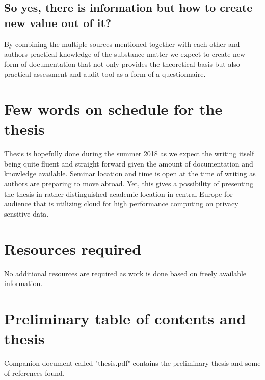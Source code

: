 \documentclass{article}
\begin{document}
\subsection{So yes, there is information but how to create new value out of it?}
By combining the multiple sources mentioned together with each other and authors practical knowledge of the substance matter we expect to create new form of documentation that not only provides the theoretical basis but also practical assessment and audit tool as a form of a questionnaire.
\section{Few words on schedule for the thesis}
Thesis is hopefully done during the summer 2018 as we expect the writing itself being quite fluent and straight forward given the amount of documentation and knowledge available. Seminar location and time is open at the time of writing as authors are preparing to move abroad. Yet, this gives a possibility of presenting the thesis in rather distinguished academic location in central Europe for audience that is utilizing cloud for high performance computing on privacy sensitive data.
\section{Resources required}
No additional resources are required as work is done based on freely available information.
\section{Preliminary table of contents and thesis}
Companion document called "thesis.pdf" contains the preliminary thesis and some of references found.
\end{document}
